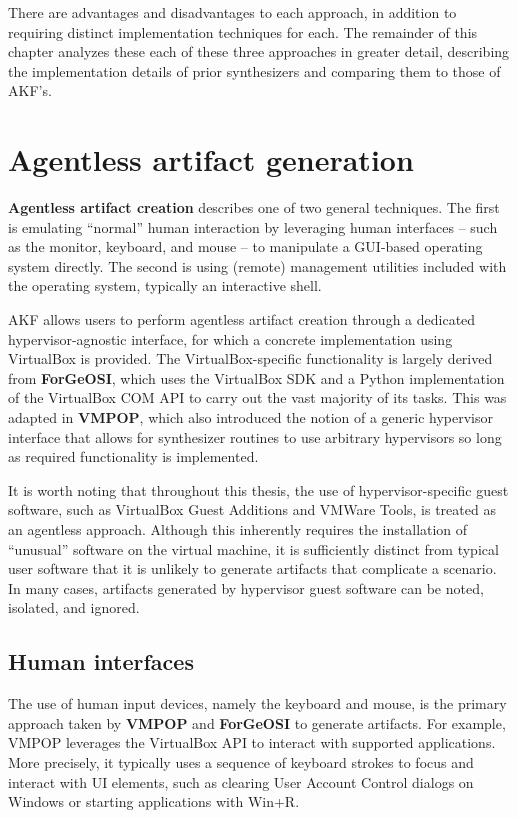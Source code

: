 There are advantages and disadvantages to each approach, in addition to
requiring distinct implementation techniques for each. The remainder of
this chapter analyzes these each of these three approaches in greater
detail, describing the implementation details of prior synthesizers and
comparing them to those of AKF's.

\section{Agentless artifact
generation}\label{agentless-artifact-generation}

\textbf{Agentless artifact creation} describes one of two general
techniques. The first is emulating ``normal'' human interaction by
leveraging human interfaces -- such as the monitor, keyboard, and mouse
-- to manipulate a GUI-based operating system directly. The second is
using (remote) management utilities included with the operating system,
typically an interactive shell.

AKF allows users to perform agentless artifact creation through a
dedicated hypervisor-agnostic interface, for which a concrete
implementation using VirtualBox is provided. The VirtualBox-specific
functionality is largely derived from \textbf{ForGeOSI}, which uses the
VirtualBox SDK and a Python implementation of the VirtualBox COM API to
carry out the vast majority of its tasks. This was adapted in
\textbf{VMPOP}, which also introduced the notion of a generic hypervisor
interface that allows for synthesizer routines to use arbitrary
hypervisors so long as required functionality is implemented.

It is worth noting that throughout this thesis, the use of
hypervisor-specific guest software, such as VirtualBox Guest Additions
and VMWare Tools, is treated as an agentless approach. Although this
inherently requires the installation of ``unusual'' software on the
virtual machine, it is sufficiently distinct from typical user software
that it is unlikely to generate artifacts that complicate a scenario. In
many cases, artifacts generated by hypervisor guest software can be
noted, isolated, and ignored.

\subsection{Human interfaces}\label{human-interfaces}

The use of human input devices, namely the keyboard and mouse, is the
primary approach taken by \textbf{VMPOP} and \textbf{ForGeOSI} to
generate artifacts. For example, VMPOP leverages the VirtualBox API to
interact with supported applications. More precisely, it typically uses
a sequence of keyboard strokes to focus and interact with UI elements,
such as clearing User Account Control dialogs on Windows or starting
applications with Win+R.

